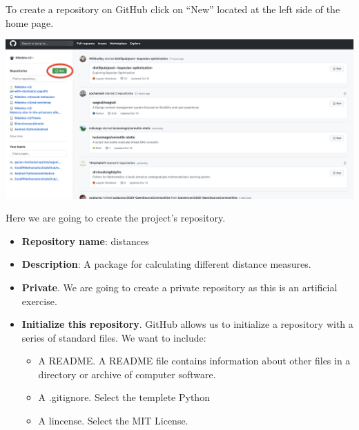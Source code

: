 \documentclass[11pt]{article}
\providecommand{\tightlist}{%
      \setlength{\itemsep}{0pt}\setlength{\parskip}{0pt}}
\begin{document}
To create a repository on GitHub click on ``New'' located at the left
side of the home page.

\includegraphics{static/creating_a_repo_part_one.png}

    Here we are going to create the project's repository.

\begin{itemize}
\tightlist
\item
  \textbf{Repository name}: distances
\item
  \textbf{Description}: A package for calculating different distance
  measures.
\item
  \textbf{Private}. We are going to create a private repository as this
  is an artificial exercise.
\item
  \textbf{Initialize this repository}. GitHub allows us to initialize a
  repository with a series of standard files. We want to include:

  \begin{itemize}
  \tightlist
  \item
    A README. A README file contains information about other files in a
    directory or archive of computer software.
  \item
    A .gitignore. Select the templete Python
  \item
    A lincense. Select the MIT License.
  \end{itemize}
\end{itemize}
\end{document}
